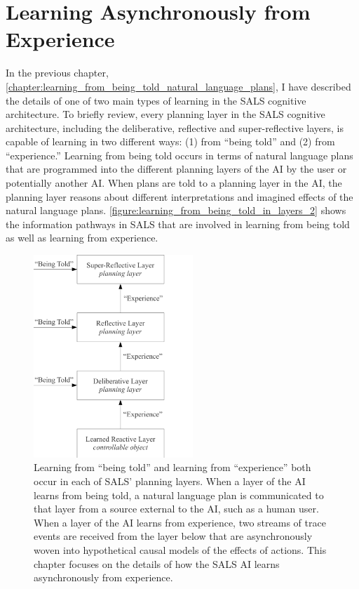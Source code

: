 \chapter{Learning Asynchronously from Experience}
\label{chapter:learning_asynchronously_from_experience}

In the previous chapter,
{\mbox{\autoref{chapter:learning_from_being_told_natural_language_plans}}},
I have described the details of one of two main types of learning in
the SALS cognitive architecture.  To briefly review, every planning
layer in the SALS cognitive architecture, including the deliberative,
reflective and super-reflective layers, is capable of learning in two
different ways: (1) from ``being told'' and (2) from ``experience.''
Learning from being told occurs in terms of natural language plans
that are programmed into the different planning layers of the AI by
the user or potentially another AI.  When plans are told to a planning
layer in the AI, the planning layer reasons about different
interpretations and imagined effects of the natural language plans.
{\mbox{\autoref{figure:learning_from_being_told_in_layers_2}}} shows
the information pathways in SALS that are involved in learning from
being told as well as learning from experience.
\begin{figure}
\centering
\includegraphics[width=6cm]{gfx/learning_from_being_told_in_layers}
\caption[Learning from ``being told'' and learning from ``experience''
  both occur in each of SALS' planning layers.]{Learning from ``being
  told'' and learning from ``experience'' both occur in each of SALS'
  planning layers.  When a layer of the AI learns from being told, a
  natural language plan is communicated to that layer from a source
  external to the AI, such as a human user.  When a layer of the AI
  learns from experience, two streams of trace events are received
  from the layer below that are asynchronously woven into hypothetical
  causal models of the effects of actions.  This chapter focuses on
  the details of how the SALS AI learns asynchronously from
  experience.}
\label{figure:learning_from_being_told_in_layers_2}
\end{figure}
